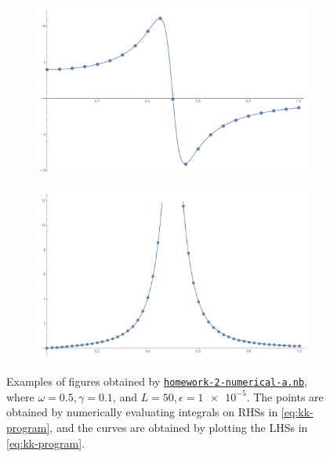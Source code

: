 \documentclass[hyperref, a4paper]{article}
\begin{document}
\begin{figure}
    \centering
    \begin{subfigure}{0.45\textwidth}
        \includegraphics[width=\textwidth]{example-re-epsilon.PNG}
    \end{subfigure}
    \begin{subfigure}{0.45\textwidth}
        \includegraphics[width=\textwidth]{example-im-epsilon.PNG}
    \end{subfigure}
    \caption{Examples of figures obtained by \href{./homework-2-numerical-a.nb}{\texttt{homework-2-numerical-a.nb}}, where $\omega = 0.5, \gamma = 0.1$, and $L = 50, \epsilon = \num{1e-5}$. The points are obtained by numerically evaluating integrals on RHSs in \eqref{eq:kk-program}, and the curves are obtained by plotting the LHSs in \eqref{eq:kk-program}.}
    \label{fig:demo-curve}
\end{figure}
\end{document}
